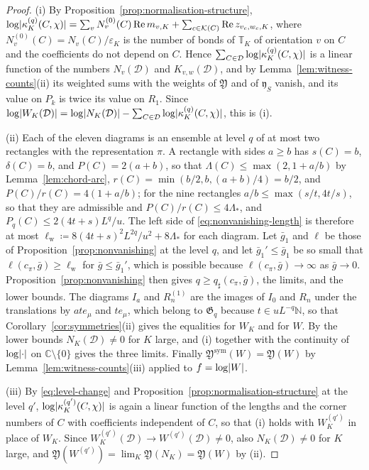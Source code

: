 \documentclass[11pt]{preprint}
\DeclarePairedDelimiter{\abs}{\lvert}{\rvert}
\numberwithin{equation}{section}
\theoremstyle{definition}
\theoremstyle{remark}
\theoremstyle{plain}
\begin{document}
\begin{proof}
(i) By Proposition~\ref{prop:normalisation-structure}, $\log\abs{\kappa^{(q)}_K(C, \chi)} = \sum_vN^{(0)}_v(C)\operatorname{Re}m_{v,K} + \sum_{c \in \mathcal K(C)}\operatorname{Re}z_{v_c,w_c,K}$, where $N^{(0)}_v(C) = N_v(C)/\varepsilon_K$ is the number of bonds of $\mathbb T_K$ of orientation $v$ on $C$ and the coefficients do not depend on $C$. Hence $\sum_{C \in \mathcal D}\log\abs{\kappa^{(q)}_K(C, \chi)}$ is a linear function of the numbers $N_v(\mathcal D)$ and $K_{v,w}(\mathcal D)$, and by Lemma~\ref{lem:witness-counts}(ii) its weighted sums with the weights of $\mathfrak Y$ and of $\mathfrak y_S$ vanish, and its value on $P_k$ is twice its value on $R_1$. Since $\log\abs{W_K(\mathcal D)} = \log\abs{N_K(\mathcal D)} - \sum_{C \in \mathcal D}\log\abs{\kappa^{(q)}_K(C, \chi)}$, this is (i).

(ii) Each of the eleven diagrams is an ensemble at level $q$ of at most two rectangles with the representation $\pi$. A rectangle with sides $a \geq b$ has $s(C) = b$, $\delta(C) = b$, and $P(C) = 2(a + b)$, so that $\Lambda(C) \leq \max(2, 1 + a/b)$ by Lemma~\ref{lem:chord-arc}, $r(C) = \min(b/2, b, (a + b)/4) = b/2$, and $P(C)/r(C) = 4(1 + a/b)$; for the nine rectangles $a/b \leq \max(s/t, 4t/s)$, so that they are admissible and $P(C)/r(C) \leq 4\Lambda_*$, and $P_q(C) \leq 2(4t + s)L^q/u$. The left side of \eqref{eq:nonvanishing-length} is therefore at most $\ell_{\mathrm{w}} \coloneqq 8(4t + s)^2L^{2q}/u^2 + 8\Lambda_*$ for each diagram. Let $\bar g_1$ and $\ell$ be those of Proposition~\ref{prop:nonvanishing} at the level $q$, and let $\bar g_1' \leq \bar g_1$ be so small that $\ell(c_\pi, \bar g) \geq \ell_{\mathrm{w}}$ for $\bar g \leq \bar g_1'$, which is possible because $\ell(c_\pi, \bar g) \to \infty$ as $\bar g \to 0$. Proposition~\ref{prop:nonvanishing} then gives $q \geq q_\sharp(c_\pi, \bar g)$, the limits, and the lower bounds. The diagrams $I_a$ and $R^{(1)}_n$ are the images of $I_0$ and $R_n$ under the translations by $ate_\mu$ and $te_\mu$, which belong to $\mathfrak G_q$ because $t \in uL^{-q}\mathbb N$, so that Corollary~\ref{cor:symmetries}(ii) gives the equalities for $W_K$ and for $W$. By the lower bounds $N_K(\mathcal D) \neq 0$ for $K$ large, and (i) together with the continuity of $\log\abs{\cdot}$ on $\mathbb C \setminus \{ 0 \}$ gives the three limits. Finally $\mathfrak Y^{\mathrm{sym}}(W) = \mathfrak Y(W)$ by Lemma~\ref{lem:witness-counts}(iii) applied to $f = \log\abs{W}$.

(iii) By \eqref{eq:level-change} and Proposition~\ref{prop:normalisation-structure} at the level $q'$, $\log\abs{\kappa^{(q')}_K(C, \chi)}$ is again a linear function of the lengths and the corner numbers of $C$ with coefficients independent of $C$, so that (i) holds with $W^{(q')}_K$ in place of $W_K$. Since $W^{(q')}_K(\mathcal D) \to W^{(q')}(\mathcal D) \neq 0$, also $N_K(\mathcal D) \neq 0$ for $K$ large, and $\mathfrak Y(W^{(q')}) = \lim_K\mathfrak Y(N_K) = \mathfrak Y(W)$ by (ii).
\end{proof}
\end{document}
